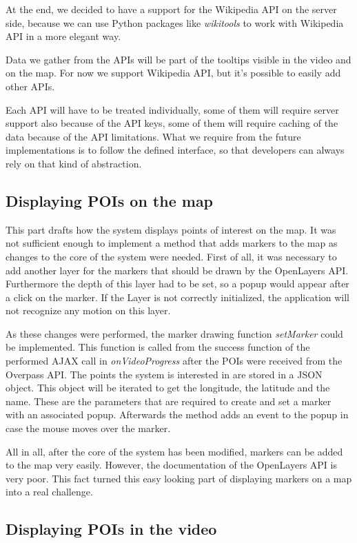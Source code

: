 \documentclass[journal]{IEEEtran}
\begin{document}
At the end, we decided to have a support for the Wikipedia API on the server side, because we can use Python packages like \textit{wikitools} to work with Wikipedia API in a more elegant way.

Data we gather from the APIs will be part of the tooltips visible in the video and on the map. For now we support Wikipedia API, but it's possible to easily add other APIs.

Each API will have to be treated individually, some of them will require server support also because of the API keys, some of them will require caching of the data because of the API limitations. What we require from the future implementations is to follow the defined interface, so that developers can always rely on that kind of abstraction.

\subsection{Displaying POIs on the map}

This part drafts how the system displays points of interest on the map. It was not sufficient enough to implement a method that adds markers to the map as changes to the core of the system were needed. First of all, it was necessary to add another layer for the markers that should be drawn by the OpenLayers API. Furthermore the depth of this layer had to be set, so a popup would appear after a click on the marker. If the Layer is not correctly initialized, the application will not recognize any motion on this layer.

As these changes were performed, the marker drawing function \textit{setMarker} could be implemented. This function is called from the success function of the performed AJAX call in \textit{onVideoProgress} after the POIs were received from the Overpass API. The points the system is interested in are stored in a JSON object. This object will be iterated to get the longitude, the latitude and the name. These are the parameters that are required to create and set a marker with an associated popup. Afterwards the method adds an event to the popup in case the mouse moves over the marker.

All in all, after the core of the system has been modified, markers can be added to the map very easily. However, the documentation of the OpenLayers API is very poor. This fact turned this easy looking part of displaying markers on a map into a real challenge.


\subsection{Displaying POIs in the video}
\end{document}
